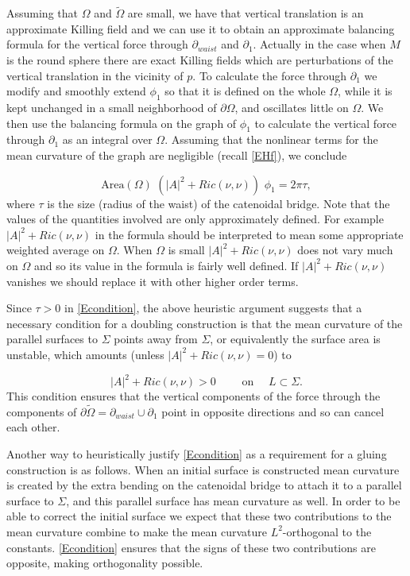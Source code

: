 \documentclass[12pt,namelimits,sumlimits]{amsart}
\theoremstyle{remark}
\numberwithin{equation}{section}
\begin{document}
Assuming that $\Omega$ and $\widetilde{\Omega}$ are small, 
we have that vertical translation is an approximate Killing field and we can use it to obtain
an approximate balancing formula for the vertical force through $\partial_{waist}$ and $\partial_1$.
Actually in the case when $M$ is the round sphere there are exact Killing fields which are perturbations of the 
vertical translation in the vicinity of $p$.
To calculate the force through $\partial_1$ we modify and smoothly extend $\phi_1$
so that it is defined on the whole $\Omega$,
while it is kept unchanged in a small neighborhood of $\partial\Omega$,
and oscillates little on $\Omega$.
We then use the balancing formula on the graph of $\phi_1$ to calculate the vertical force
through $\partial_1$ as an integral over $\Omega$.
Assuming that the nonlinear terms for the mean curvature of the graph are negligible (recall \ref{EHf}),
we conclude \cite[equation 1.1]{kapouleas:clifford}
\addtocounter{theorem}{1}
\begin{equation}
\label{Earea}
\text{Area}(\Omega)\,\, (|A|^2+Ric(\nu,\nu))\,\,\phi_1=2\pi\tau,
\end{equation}
where $\tau$ is the size (radius of the waist) of the catenoidal bridge.
Note that the values of the quantities involved are only approximately defined.
For example $|A|^2+Ric(\nu,\nu)$ in the formula should be
interpreted to mean some appropriate weighted average on $\Omega$.
When $\Omega$ is small $|A|^2+Ric(\nu,\nu)$ does not vary much on $\Omega$
and so its value in the formula is fairly well defined.
If $|A|^2+Ric(\nu,\nu)$ vanishes we should replace it with other higher order terms.

Since $\tau>0$ in \ref{Econdition},
the above heuristic argument suggests that a necessary condition for a doubling construction
is that the mean curvature of the parallel surfaces to $\Sigma$ points away from $\Sigma$,
or equivalently the surface area is unstable,
which amounts (unless $|A|^2+Ric(\nu,\nu)=0$) to
\addtocounter{theorem}{1}
\begin{equation}
\label{Econdition}
|A|^2+Ric(\nu,\nu) >0 \qquad\text{ on }\quad L \subset \Sigma.
\end{equation}
This condition ensures that the vertical components of the force through 
the components of 
$\partial\widetilde{\Omega}=\partial_{waist}\cup\partial_1$
point in opposite directions and so can cancel each other.

Another way to heuristically justify \ref{Econdition} as a requirement for a gluing construction
is as follows.
When an initial surface is constructed mean curvature is created by the extra bending on the catenoidal
bridge to attach it to a parallel surface to $\Sigma$, and this parallel surface
has mean curvature as well.
In order to be able to correct the initial surface we expect that these two contributions to the mean curvature
combine to make the mean curvature $L^2$-orthogonal to the constants.
\ref{Econdition} ensures that the signs of these two contributions are opposite,
making orthogonality possible.
\end{document}
